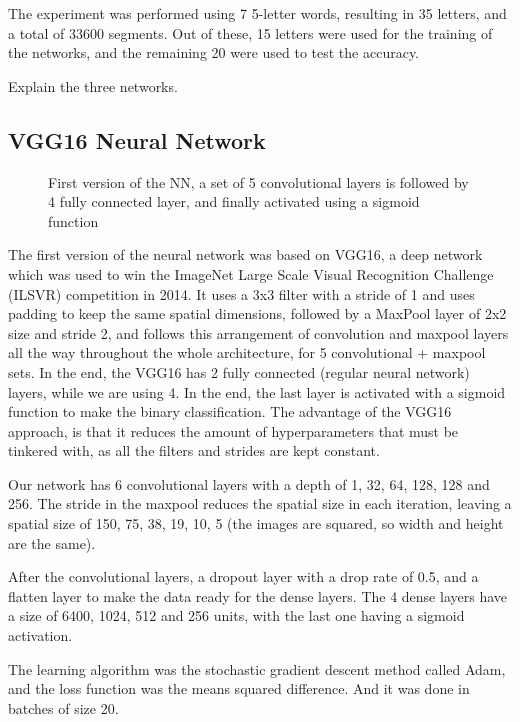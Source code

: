 \documentclass[conference]{IEEEtran}
\begin{document}
The experiment was performed using 7 5-letter words, resulting in 35 letters, and a total of 33600 segments. Out of these, 15 letters were used for the training of the networks, and the remaining 20 were used to test the accuracy.


Explain the three networks.

\subsection{VGG16 Neural Network}

\begin{figure}[!t]

\caption[VGG16 Neural Network]{First version of the NN, a set of 5 convolutional layers is followed by 4 fully connected layer, and finally activated using a sigmoid function}
\label{fig:nnv1}
\end{figure}


The first version of the neural network was based on VGG16, a deep network which was used to win the ImageNet Large Scale Visual Recognition Challenge (ILSVR) competition in 2014\cite{ilsvr2014}. It uses a 3x3 filter with a stride of 1 and uses padding to keep the same spatial dimensions, followed by a MaxPool layer of 2x2 size and stride 2, and follows this arrangement of convolution and maxpool layers all the way throughout the whole architecture, for 5 convolutional + maxpool sets. In the end, the VGG16 has 2 fully connected (regular neural network) layers, while we are using 4. In the end, the last layer is activated with a sigmoid function to make the binary classification. 
The advantage of the VGG16 approach, is that it reduces the amount of hyperparameters that must be tinkered with, as all the filters and strides are kept constant. 

Our network has 6 convolutional layers with a depth of 1, 32, 64, 128, 128 and 256. The stride in the maxpool reduces the spatial size in each iteration, leaving a spatial size of 150, 75, 38, 19, 10, 5 (the images are squared, so width and height are the same). 

After the convolutional layers, a dropout layer with a drop rate of 0.5, and a flatten layer to make the data ready for the dense layers. The 4 dense layers have a size of 6400, 1024, 512 and 256 units, with the last one having a sigmoid activation.

The learning algorithm was the stochastic gradient descent method called Adam\cite{adam2014}, and the loss function was the means squared difference. And it was done in batches of size 20. 
\end{document}

